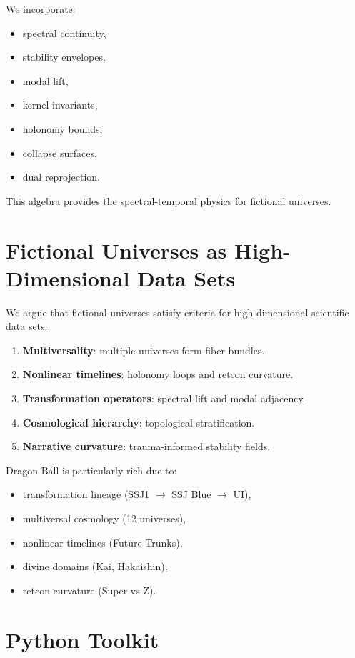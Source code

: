\documentclass[11pt]{article}
\begin{document}
We incorporate:
\begin{itemize}
  \item spectral continuity,
  \item stability envelopes,
  \item modal lift,
  \item kernel invariants,
  \item holonomy bounds,
  \item collapse surfaces,
  \item dual reprojection.
\end{itemize}

This algebra provides the spectral-temporal physics for fictional universes.

\section{Fictional Universes as High-Dimensional Data Sets}

We argue that fictional universes satisfy criteria for high-dimensional 
scientific data sets:

\begin{enumerate}
  \item \textbf{Multiversality}: multiple universes form fiber bundles.
  \item \textbf{Nonlinear timelines}: holonomy loops and retcon curvature.
  \item \textbf{Transformation operators}: spectral lift and modal adjacency.
  \item \textbf{Cosmological hierarchy}: topological stratification.
  \item \textbf{Narrative curvature}: trauma-informed stability fields.
\end{enumerate}

Dragon Ball is particularly rich due to:
\begin{itemize}
  \item transformation lineage (SSJ1 $\to$ SSJ Blue $\to$ UI),
  \item multiversal cosmology (12 universes),
  \item nonlinear timelines (Future Trunks),
  \item divine domains (Kai, Hakaishin),
  \item retcon curvature (Super vs Z).
\end{itemize}

\section{Python Toolkit}
\end{document}
